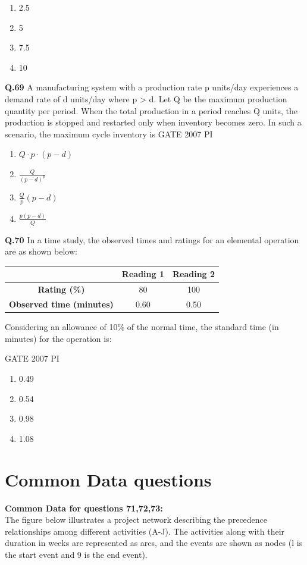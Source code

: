 \documentclass[journal,12pt,onecolumn]{exam}
\theoremstyle{remark}
\begin{document}
\begin{enumerate}
    \item 2.5
    \item 5
    \item 7.5
    \item 10
\end{enumerate}
\noindent
\textbf{Q.69}
A manufacturing system with a production rate p units/day experiences a demand rate of d units/day where p > d. Let Q be the maximum production quantity per period. When the total production in a period reaches Q units, the production is stopped and restarted only when inventory becomes zero. In such a scenario, the maximum cycle inventory is
\hfill{GATE 2007 PI}
\begin{enumerate}
    \item \( Q \cdot p \cdot (p - d) \)
    \item \( \frac{Q}{(p - d)^p} \)
    \item \( \frac{Q}{p} (p - d) \)
    \item \( \frac{p(p - d)}{Q} \)
\end{enumerate}
\noindent
\textbf{Q.70}
In a time study, the observed times and ratings for an elemental operation are as shown below:

\begin{center}
\begin{tabular}{|c|c|c|}
\hline
 & \textbf{Reading 1} & \textbf{Reading 2} \\
\hline
\textbf{Rating (\%)} & 80 & 100 \\
\hline
\textbf{Observed time (minutes)} & 0.60 & 0.50 \\
\hline
\end{tabular}
\end{center}

Considering an allowance of 10\% of the normal time, the standard time (in minutes) for the operation is:

\hfill{GATE 2007 PI}

\begin{enumerate}
    \item 0.49
    \item 0.54
    \item 0.98
    \item 1.08
\end{enumerate}

\section{Common Data questions}
\textbf{Common Data for questions 71,72,73:}\\
The figure below illustrates a project network describing the precedence relationships among different activities (A-J). The activities along with their duration in weeks are represented as arcs, and the events are shown as nodes (l is the start event and 9 is the end event).
\end{document}
